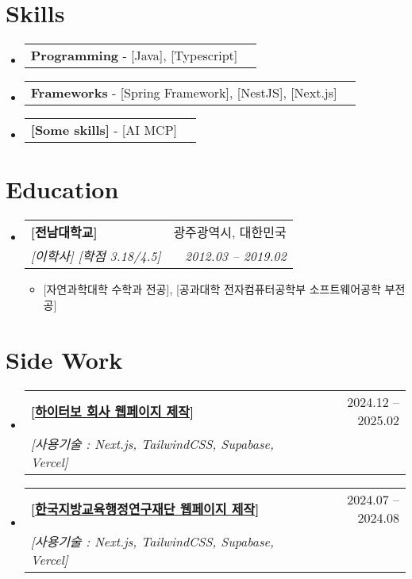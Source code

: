 \documentclass[letterpaper,11pt]{article}
\makeatletter
\newcommand{\resumeItem}[1]{
  \item\small{
    {#1 \vspace{-2pt}}
  }
}
\newcommand{\resumeSubheading}[4]{
  \vspace{-1pt}\item
    \begin{tabular*}{0.97\textwidth}[t]{l@{\extracolsep{\fill}}r}
      \textbf{#1} & #2 \\
      \textit{\small#3} & \textit{\small #4} \\
    \end{tabular*}\vspace{-5pt}
}
\newcommand{\resumeSkills}[1]{
  \item
    \begin{tabular*}{0.97\textwidth}[t]{l@{\extracolsep{\fill}}r}
      #1
    \end{tabular*}
}
\newcommand{\resumeCommunity}[3]{
  \vspace{-1pt}\item
    \begin{tabular*}{0.97\textwidth}[t]{l@{\extracolsep{\fill}}r}
      \textbf{#1} & #2 \\
      \textit{\small#3} \\
    \end{tabular*}\vspace{-5pt}
}
\newcommand{\resumeSubHeadingListStart}{\begin{itemize}[leftmargin=*]}
\newcommand{\resumeSubHeadingListEnd}{\end{itemize}}
\newcommand{\resumeItemListStart}{\begin{itemize}}
\newcommand{\resumeItemListEnd}{\end{itemize}\vspace{-5pt}}
\makeatother
\begin{document}

\section{Skills}
  \resumeSubHeadingListStart
    \resumeSkills{\textbf{Programming} - [Java], [Typescript]}
    \resumeSkills{\textbf{Frameworks} - [Spring Framework], [NestJS], [Next.js]}
    \resumeSkills{\textbf{[Some skills]} - [AI MCP]}
  \resumeSubHeadingListEnd

\section{Education}
  \resumeSubHeadingListStart
    \resumeSubheading
      {[전남대학교]}{광주광역시, 대한민국}
      {[이학사] [학점 3.18/4.5]}{2012.03 -- 2019.02}
      \resumeItemListStart
          \resumeItem{[자연과학대학 수학과 전공], [공과대학 전자컴퓨터공학부 소프트웨어공학 부전공]}
      \resumeItemListEnd

  \resumeSubHeadingListEnd

\section{Side Work}
    \resumeSubHeadingListStart
        \resumeCommunity{[\href{http://www.highturbo.co.kr}{하이터보 회사 웹페이지 제작}]}{2024.12 -- 2025.02}
        {[사용기술 : Next.js, TailwindCSS, Supabase, Vercel]}
        
        \resumeCommunity{[\href{http://www.klea.re.kr}{한국지방교육행정연구재단 웹페이지 제작}]}{2024.07 -- 2024.08}
        {[사용기술 : Next.js, TailwindCSS, Supabase, Vercel]}
    
    \resumeSubHeadingListEnd

\end{document}
